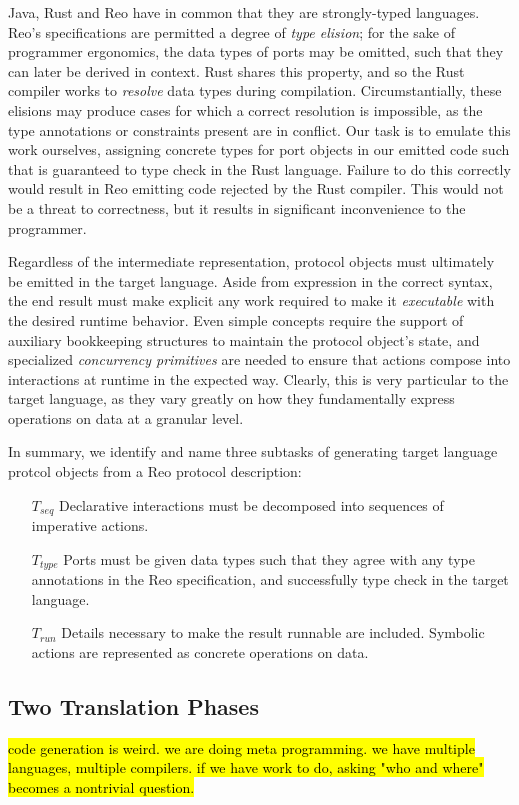 Java, Rust and Reo have in common that they are strongly-typed languages. Reo's specifications are permitted a degree of \textit{type elision}; for the sake of programmer ergonomics, the data types of ports may be omitted, such that they can later be derived in context. Rust shares this property, and so the Rust compiler works to \textit{resolve} data types during compilation. Circumstantially, these elisions may produce cases for which a correct resolution is impossible, as the type annotations or constraints present are in conflict. Our task is to emulate this work ourselves, assigning concrete types for port objects in our emitted code such that is guaranteed to type check in the Rust language. Failure to do this correctly would result in Reo emitting code rejected by the Rust compiler. This would not be a threat to correctness, but it results in significant inconvenience to the programmer.

Regardless of the intermediate representation, protocol objects must ultimately be emitted in the target language. Aside from expression in the correct syntax, the end result must make explicit any work required to make it \textit{executable} with the desired runtime behavior. Even simple concepts require the support of auxiliary bookkeeping structures to maintain the protocol object's state, and specialized \textit{concurrency primitives} are needed to ensure that actions compose into interactions at runtime in the expected way. Clearly, this is very particular to the target language, as they vary greatly on how they fundamentally express operations on data at a granular level.

In summary, we identify and name three subtasks of generating target language protcol objects from a Reo protocol description:
\begin{itemize}
	\item [$T_{seq}$] Declarative interactions must be decomposed into sequences of imperative actions.
	\item [$T_{type}$] Ports must be given data types such that they agree with any type annotations in the Reo specification, and successfully type check in the target language.
	\item [$T_{run}$] Details necessary to make the result runnable are included. Symbolic actions are represented as concrete operations on data.
\end{itemize}


\subsection{Two Translation Phases}
\hl{
	code generation is weird. we are doing meta programming. we have multiple languages, multiple compilers. if we have work to do, asking "who and where" becomes a nontrivial question. 
}


